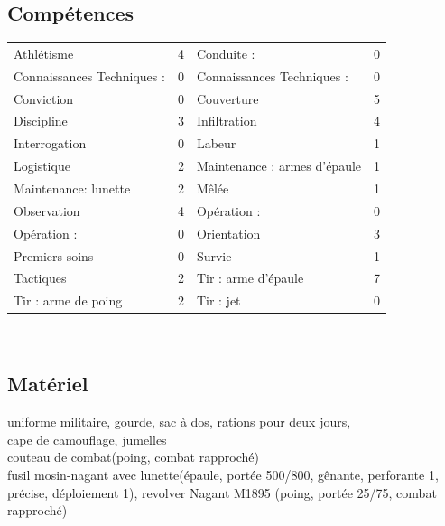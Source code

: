\documentclass{report}
\begin{document}
\subsection*{Compétences}
\begin{tabular}{p{}| r || p{}| r|}
Athlétisme &4 &Conduite : & 0\\
Connaissances Techniques : & 0 &Connaissances Techniques : & 0\\
Conviction & 0 &Couverture& 5\\
Discipline & 3 &Infiltration& 4\\
Interrogation & 0& Labeur& 1\\
Logistique & 2& Maintenance : armes d'épaule & 1 \\
Maintenance: lunette& 2 & Mêlée& 1\\
Observation & 4 & Opération : & 0\\
Opération : & 0 & Orientation& 3\\
Premiers soins & 0 & Survie& 1\\
Tactiques & 2 & Tir : arme d'épaule& 7\\
Tir : arme de poing & 2& Tir : jet & 0\\
\end{tabular}\\
\noindent\makebox[\linewidth]{\rule{\textwidth}{0.4pt}}
\subsection*{Matériel}
uniforme militaire, gourde, sac à dos, rations pour deux jours,\\
cape de camouflage, jumelles \\
couteau de combat(poing, combat rapproché)\\
fusil mosin-nagant avec lunette(épaule, portée 500/800, gênante, perforante 1, précise, déploiement 1), revolver Nagant M1895 (poing, portée 25/75, combat rapproché)\\
\noindent\makebox[\linewidth]{\rule{\textwidth}{0.4pt}}
\end{document}
